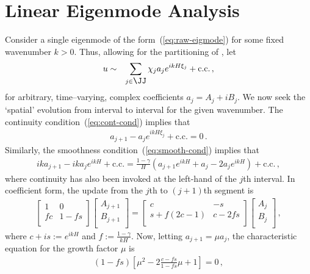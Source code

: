 \documentclass[12pt,a5paper]{article}
\begin{document}
\section{Linear Eigenmode Analysis}
Consider a single eigenmode of the form~(\ref{eq:raw-eigmode}) for some fixed wavenumber $k>0$. 
Thus, allowing for the partitioning of \XX, let
\begin{eqnarray}
u & \sim & \sum_{j\in\JJ} \chi_j a_j e^{ikH\xi_j} + \text{c.c.}\,,
\end{eqnarray}
for arbitrary, time--varying, complex coefficients $a_j=A_j+iB_j$. 
We now seek the `spatial' evolution from interval to interval for the given wavenumber.
The continuity condition~(\ref{eq:cont-cond}) implies that
\begin{eqnarray}
a_{j+1} - a_j e^{ikH\xi_j} + \text{c.c.} = 0\,.
\end{eqnarray}
Similarly, the smoothness condition~(\ref{eq:smooth-cond}) implies that 
\begin{eqnarray}
ik a_{j+1} -ik a_j e^{ikH} + \text{c.c.} =  
\frac{1-\gamma}{H}\left(
a_{j+1} e^{ikH} + a_j - 2 a_j e^{ikH}
\right)
+ \text{c.c.}\,,
\end{eqnarray}
where continuity has also been invoked at the left-hand of the $j$th interval.
In coefficient form, the update from the $j$th to $(j+1)$th segment is
\begin{eqnarray}
\left[\begin{array}{cc}
1 & 0\\
fc & 1-fs\\
\end{array}\right]
\left[\begin{array}{c}
A_{j+1}\\
B_{j+1}\\
\end{array}\right]
=
\left[\begin{array}{cc}
c & -s\\
s+f(2c-1) & c-2fs\\
\end{array}\right]
\left[\begin{array}{c}
A_{j}\\
B_{j}\\
\end{array}\right]\,,
\end{eqnarray}
where $c+is:=e^{ikH}$ and $f:=\frac{1-\gamma}{kH}$.
Now, letting $a_{j+1}=\mu a_j$, the characteristic equation for 
the growth factor $\mu$ is
\begin{eqnarray}
(1-fs)\left[\mu^2-2\frac{c-fs}{1-fs}\mu+1\right] = 0\,,
\end{eqnarray}
\end{document}
